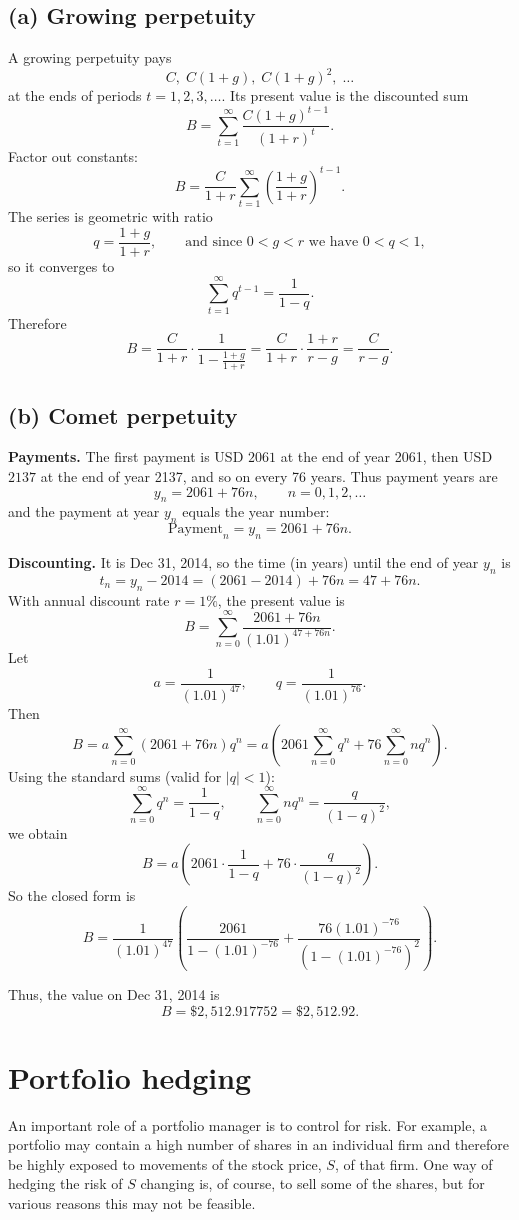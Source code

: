 \documentclass{article}
\begin{document}
\subsection*{(a) Growing perpetuity}

A growing perpetuity pays
$$
C,\; C(1+g),\; C(1+g)^2,\;\dots
$$
at the ends of periods $t=1,2,3,\dots$. Its present value is the discounted sum
$$
B=\sum_{t=1}^{\infty}\frac{C(1+g)^{t-1}}{(1+r)^t}.
$$
Factor out constants:
$$
B=\frac{C}{1+r}\sum_{t=1}^{\infty}\left(\frac{1+g}{1+r}\right)^{t-1}.
$$
The series is geometric with ratio
$$
q=\frac{1+g}{1+r},
\qquad \text{and since } 0<g<r \text{ we have } 0<q<1,
$$
so it converges to
$$
\sum_{t=1}^{\infty} q^{t-1}=\frac{1}{1-q}.
$$
Therefore
$$
B=\frac{C}{1+r}\cdot \frac{1}{1-\frac{1+g}{1+r}}
=\frac{C}{1+r}\cdot \frac{1+r}{r-g}
=\boxed{\frac{C}{r-g}}.
$$


\subsection*{(b) Comet perpetuity}

\textbf{Payments.} The first payment is USD $2061$ at the end of year 2061, then USD $2137$ at the end of year 2137, and so on every 76 years. Thus payment years are
$$
y_n = 2061 + 76n,\qquad n=0,1,2,\dots
$$
and the payment at year $y_n$ equals the year number:
$$
\text{Payment}_n = y_n = 2061+76n.
$$

\textbf{Discounting.} It is Dec 31, 2014, so the time (in years) until the end of year $y_n$ is
$$
t_n = y_n - 2014 = (2061-2014)+76n = 47+76n.
$$
With annual discount rate $r=1\%$, the present value is
$$
B=\sum_{n=0}^{\infty}\frac{2061+76n}{(1.01)^{47+76n}}.
$$
Let
$$
a = \frac{1}{(1.01)^{47}}, \qquad q=\frac{1}{(1.01)^{76}}.
$$
Then
$$
B = a\sum_{n=0}^{\infty}(2061+76n)q^n
= a\left(2061\sum_{n=0}^{\infty}q^n + 76\sum_{n=0}^{\infty}nq^n\right).
$$
Using the standard sums (valid for $|q|<1$):
$$
\sum_{n=0}^{\infty}q^n=\frac{1}{1-q},
\qquad
\sum_{n=0}^{\infty}nq^n=\frac{q}{(1-q)^2},
$$
we obtain
$$
B
= a\left(2061\cdot \frac{1}{1-q} + 76\cdot \frac{q}{(1-q)^2}\right).
$$
So the closed form is
$$
\boxed{
B=\frac{1}{(1.01)^{47}}
\left(
\frac{2061}{1-(1.01)^{-76}}
+
\frac{76(1.01)^{-76}}{\left(1-(1.01)^{-76}\right)^2}
\right)}.
$$

Thus, the value on Dec 31, 2014 is
$$
\boxed{B = \$2{,}512.917752=\$2{,}512.92.}
$$



\newpage
\section{Portfolio hedging}
An important role of a portfolio manager is to control for risk. For example, a portfolio may contain a high number of shares in an individual firm and therefore be highly exposed to movements of the stock price, $S$, of that firm. One way of hedging the risk of $S$ changing is, of course, to sell some of the shares, but for various reasons this may not be feasible.
\end{document}
